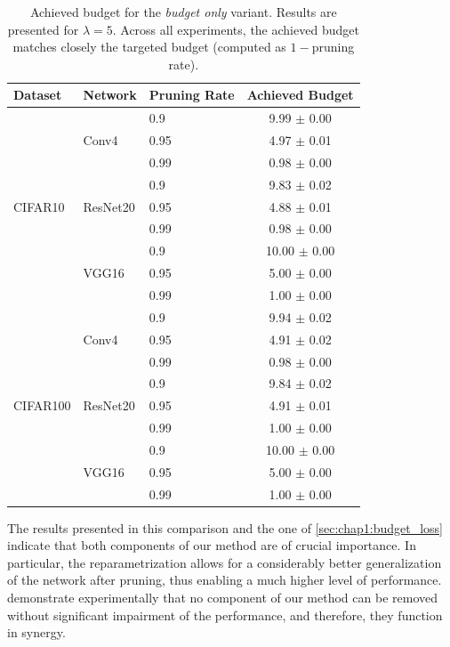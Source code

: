 \begin{table}
\centering
\begin{tabular}{lllc}
  \toprule
  \textbf{Dataset} & \textbf{Network} & \textbf{Pruning Rate} & \textbf{Achieved Budget} \\
  \midrule
  \multirow{9}{*}{CIFAR10} & \multirow{3}{*}{Conv4} & 0.9 & 9.99 $\pm$ 0.00 \\
     &  & 0.95 & 4.97 $\pm$ 0.01 \\
     &  & 0.99 & 0.98 $\pm$ 0.00 \\
     \cline{2-4}
   & \multirow{3}{*}{ResNet20} & 0.9 & 9.83 $\pm$ 0.02 \\
     &  & 0.95 & 4.88 $\pm$ 0.01 \\
     &  & 0.99 & 0.98 $\pm$ 0.00 \\
     \cline{2-4}

   & \multirow{3}{*}{VGG16} & 0.9 & 10.00 $\pm$ 0.00 \\
     &  & 0.95 & 5.00 $\pm$ 0.00 \\
    &  & 0.99 & 1.00 $\pm$ 0.00 \\
    \midrule
  \multirow{9}{*}{CIFAR100} & \multirow{3}{*}{Conv4} & 0.9 & 9.94 $\pm$ 0.02 \\
     &  & 0.95 & 4.91 $\pm$ 0.02 \\
    &  & 0.99 & 0.98 $\pm$ 0.00 \\
    \cline{2-4}

   & \multirow{3}{*}{ResNet20} & 0.9 & 9.84 $\pm$ 0.02 \\
     &  & 0.95 & 4.91 $\pm$ 0.01 \\
     &  & 0.99 & 1.00 $\pm$ 0.00 \\
     \cline{2-4}

   & \multirow{3}{*}{VGG16} & 0.9 & 10.00 $\pm$ 0.00 \\
     &  & 0.95 & 5.00 $\pm$ 0.00 \\
    &  & 0.99 & 1.00 $\pm$ 0.00 \\
  \bottomrule
  \end{tabular}
  \caption{Achieved budget for the \emph{budget only} variant. Results are
  presented for $\lambda=5$. Across all experiments, the achieved budget matches
  closely the targeted budget (computed as $1-$pruning
  rate).}
  \label{tab:chap1:impact_of_reparametrisation}
\end{table}



The results presented in this comparison and the one of
\cref{sec:chap1:budget_loss} indicate that both components of our method are of
crucial importance. In particular, the reparametrization allows for a
considerably better generalization of the network after pruning, thus enabling a
much higher level of performance.
demonstrate experimentally that no component of our method can be removed
without significant impairment of the performance, and therefore, they
function in synergy.

